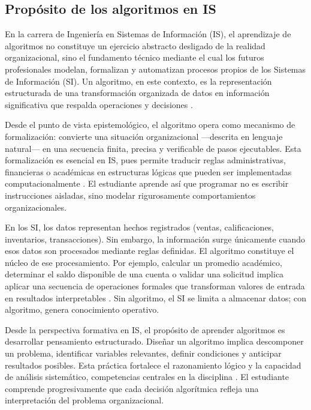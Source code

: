 \documentclass[12pt,twoside]{book}
\begin{document}
				\subsection{Propósito de los algoritmos en IS}
				\noindent
					En la carrera de Ingeniería en Sistemas de Información (IS), el aprendizaje de algoritmos no constituye un ejercicio abstracto desligado de la realidad organizacional, sino el fundamento técnico mediante el cual los futuros profesionales modelan, formalizan y automatizan procesos propios de los Sistemas de Información (SI). Un algoritmo, en este contexto, es la representación estructurada de una transformación organizada de datos en información significativa que respalda operaciones y decisiones \cite{Laudon2020Management,Kendall2014Systems,Pressman2019Software}.
					
					Desde el punto de vista epistemológico, el algoritmo opera como mecanismo de formalización: convierte una situación organizacional —descrita en lenguaje natural— en una secuencia finita, precisa y verificable de pasos ejecutables. Esta formalización es esencial en IS, pues permite traducir reglas administrativas, financieras o académicas en estructuras lógicas que pueden ser implementadas computacionalmente \cite{SWEBOK2025Guide,Sommerville2015Software}. El estudiante aprende así que programar no es escribir instrucciones aisladas, sino modelar rigurosamente comportamientos organizacionales.
					
					En los SI, los datos representan hechos registrados (ventas, calificaciones, inventarios, transacciones). Sin embargo, la información surge únicamente cuando esos datos son procesados mediante reglas definidas. El algoritmo constituye el núcleo de ese procesamiento. Por ejemplo, calcular un promedio académico, determinar el saldo disponible de una cuenta o validar una solicitud implica aplicar una secuencia de operaciones formales que transforman valores de entrada en resultados interpretables \cite{Laudon2020Management,Floridi2003Data}. Sin algoritmo, el SI se limita a almacenar datos; con algoritmo, genera conocimiento operativo.
					
					Desde la perspectiva formativa en IS, el propósito de aprender algoritmos es desarrollar pensamiento estructurado. Diseñar un algoritmo implica descomponer un problema, identificar variables relevantes, definir condiciones y anticipar resultados posibles. Esta práctica fortalece el razonamiento lógico y la capacidad de análisis sistemático, competencias centrales en la disciplina \cite{Wing2006Computational,Cormen2022Introduction}. El estudiante comprende progresivamente que cada decisión algorítmica refleja una interpretación del problema organizacional.
					
\end{document}
